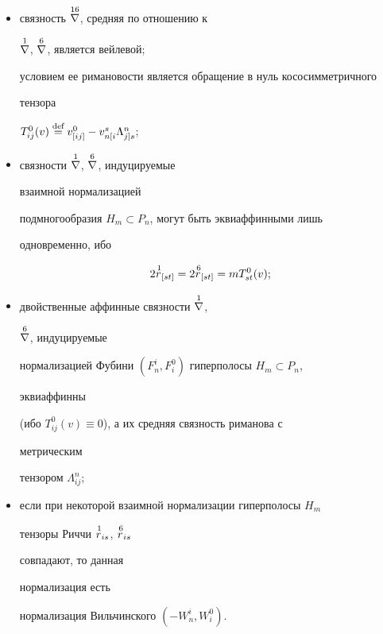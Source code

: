 \begin{itemize} 


\item[---] связность $\overset{16}{\nabla}{}$, средняя по отношению к 


$\overset{1}{\nabla}{}$, $\overset{6}{\nabla}{}$, является вейлевой; 


условием ее римановости является обращение в нуль кососимметричного 


тензора 


$T^0_{ij}(v)\overset{\text{def}}{=}{}v^0_{[ij]}-v^s_{n[i}\Lambda^n_{j]s}$; 


\item[---] связности $\overset{1}{\nabla}{}$, $\overset{6}{\nabla}{}$, индуцируемые 


взаимной нормализацией 


подмногообразия $H_m\subset P_n$, могут быть эквиаффинными лишь 


одновременно, ибо 


\begin{equation} 


2\up{\,1}{r}_{[s t]}=2\up{\,6}{r}_{[s t]}= 


m T^0_{s t}(v); 


\end{equation} 


\item[---] двойственные аффинные связности $\overset{1}{\nabla}{}$, 


$\overset{6}{\nabla}{}$, индуцируемые 


нормализацией Фубини $(F^i_n,F^0_i)$ гиперполосы $H_m\subset P_n$, 


эквиаффинны 


(ибо $T^0_{ij}(v)\equiv 0$), а их средняя связность риманова с 


метрическим 


тензором $\Lambda^n_{ij}$; 


\item[---] если при некоторой взаимной нормализации гиперполосы $H_m$ 


тензоры Риччи $\overset{\,1}{r}{}_{is}$, $\overset{\,6}{r}{}_{is}$ 


совпадают, то данная 


нормализация есть 


нормализация Вильчинского $(-W^i_n,W^0_i)$. 


\end{itemize} 


 


